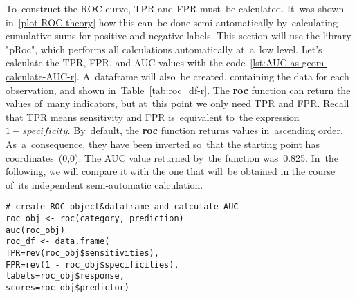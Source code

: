 \documentclass[]{scrreprt}
\begin{document}
To~construct the ROC curve, TPR and FPR must~be calculated. It~was shown in~\ref{plot-ROC-theory} how this can~be done semi-automatically by~calculating cumulative sums for positive and negative labels. This section will use the library "pRoc", which performs all calculations automatically at~a~low level. Let's calculate the TPR, FPR, and AUC values with the code~\ref{lst:AUC-as-geom-calculate-AUC-r}. A~dataframe will also~be created, containing the data for each observation, and shown in~Table~\ref{tab:roc_df-r}. The \textbf{roc} function can return the values of~many indicators, but at~this point we only need TPR and FPR. Recall that TPR means sensitivity and FPR is~equivalent to~the expression $1 - specificity$. By~default, the \textbf{roc} function returns values in~ascending order. As~a~consequence, they have been inverted so~that the starting point has coordinates~(0,0). The AUC value returned by~the function was~0.825. In~the following, we will compare it with the one that will~be obtained in the course of~its independent semi-automatic calculation.
%
\begin{lstlisting}[float, caption = Calculation of~the AUC using the pRoc library, firstnumber=1, label= lst:AUC-as-geom-calculate-AUC-r]
# create ROC object&dataframe and calculate AUC
roc_obj <- roc(category, prediction)
auc(roc_obj)
roc_df <- data.frame(
TPR=rev(roc_obj$sensitivities), 
FPR=rev(1 - roc_obj$specificities), 
labels=roc_obj$response, 
scores=roc_obj$predictor)
\end{lstlisting}
%
\end{document}
